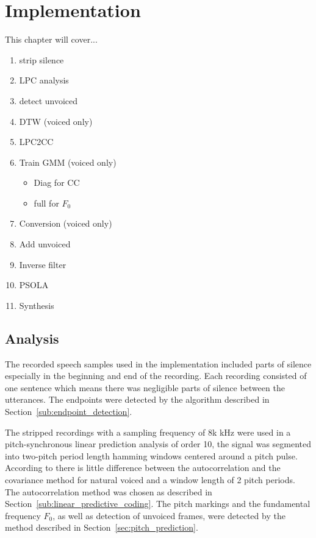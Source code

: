 \chapter{Implementation} %
\label{cha:implementation}
This chapter will cover...
\begin{enumerate}
	\item strip silence
	\item LPC analysis
	\item detect unvoiced
	\item DTW (voiced only)
	\item LPC2CC
	\item Train GMM (voiced only)
	\begin{itemize}
		\item Diag for CC
		\item full for $F_0$
	\end{itemize}
	\item Conversion (voiced only)
	\item Add unvoiced
	\item Inverse filter
	\item PSOLA
	\item Synthesis
\end{enumerate}

\section{Analysis} %
\label{sec:analysis}
The recorded speech samples used in the implementation included parts of silence especially in the beginning and end of the recording. Each recording consisted of one sentence which means there was negligible parts of silence between the utterances. The endpoints were detected by the algorithm described in Section~\ref{sub:endpoint_detection}.

The stripped recordings with a sampling frequency of 8k kHz were used in a pitch-synchronous linear prediction analysis of order 10, \ie the signal was segmented into two-pitch period length hamming windows centered around a pitch pulse. According to \cite{chandra74} there is little difference between the autocorrelation and the covariance method for natural voiced and a window length of 2 pitch periods. The autocorrelation method was chosen as described in Section~\ref{sub:linear_predictive_coding}. The pitch markings and the fundamental frequency $F_0$, as well as detection of unvoiced frames, were detected by the method described in Section~\ref{sec:pitch_prediction}. 

